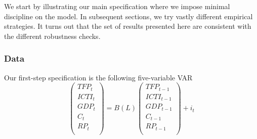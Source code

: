 \documentclass[12pt]{article}
\begin{document}
We start by illustrating our main specification where we impose minimal discipline on the model. In subsequent sections, we try vastly different empirical strategies. It turns out that the set of results presented here are consistent with the different robustness checks.

\subsubsection{Data}

Our first-step specification is the following five-variable VAR 
\begin{equation}\label{eq:mainSpecification}
\begin{pmatrix}
TFP_t \\ 
ICTI_t \\
GDP_t \\
C_t \\
RP_t \\
\end{pmatrix} = B(L) \begin{pmatrix}
TFP_{t-1} \\ 
ICTI_{t-1} \\
GDP_{t-1} \\
C_{t-1} \\
RP_{t-1} \\
\end{pmatrix} + i_t
\end{equation}
\end{document}
